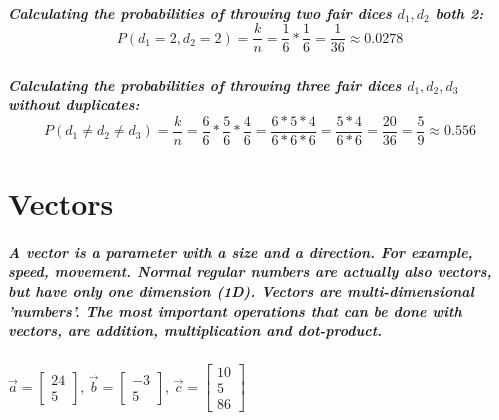 \documentclass[11pt]{report}
\begin{document}
    \paragraph{
    Calculating the probabilities of throwing two fair dices \(d_1, d_2\) both 2: \[P({d_1=2, d_2=2}) = \frac{k}{n} = \frac{1}{6} * \frac{1}{6} = \frac{1}{36} \approx 0.0278\]
    }

    \paragraph{
    Calculating the probabilities of throwing three fair dices \(d_1, d_2, d_3\) without duplicates: \[P({d_1 \neq d_2 \neq d_3}) = \frac{k}{n} = \frac{6}{6} * \frac{5}{6} * \frac{4}{6} = \frac{6 * 5 * 4}{6 * 6 * 6} = \frac{5 * 4}{6 * 6} = \frac{20}{36} = \frac{5}{9} \approx 0.556\]
    }
    
	\chapter{Vectors}\label{Vectors}

    \paragraph{
    A vector is a parameter with a size and a direction. For example, speed, movement. Normal regular numbers are actually also vectors, but have only one dimension (1D). Vectors are multi-dimensional 'numbers'. The most important operations that can be done with vectors, are addition, multiplication and dot-product.
    }

    \begin{center}
        \(\vec{a} = \begin{bmatrix}
        24\\
        5
    \end{bmatrix}\),
    \(\vec{b} = \begin{bmatrix}
        -3\\
        5
    \end{bmatrix}\),
    \(\vec{c} = \begin{bmatrix}
        10\\
        5\\
        86
    \end{bmatrix}\)
    \end{center}
\end{document}
